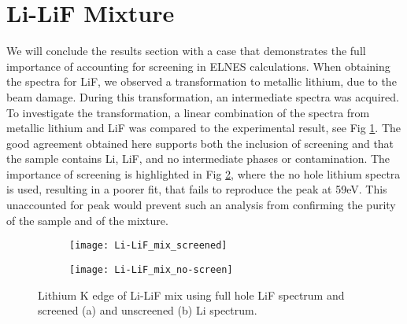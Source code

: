 \section{Li-LiF Mixture}
We will conclude the results section with a case that demonstrates the full importance of accounting for screening in ELNES calculations.  When obtaining the spectra for LiF, we observed a transformation to metallic lithium, due to the beam damage.   During this transformation, an intermediate spectra was acquired.  To investigate the transformation, a linear combination of the spectra from metallic lithium and LiF was compared to the experimental result, see Fig \ref{mix-screened}.  The good agreement obtained here supports both the inclusion of screening and that the sample contains  Li, LiF, and no intermediate phases or contamination.  The importance of screening is highlighted in Fig \ref{mix-unscreened}, where the no hole lithium spectra is used, resulting in a poorer fit, that fails to reproduce the peak at 59eV.  This unaccounted for peak would prevent such an  analysis from confirming the purity of the sample and of the mixture.  



\begin{figure}
	\centering
	\begin{subfigure}{0.45\textwidth}
		\texttt{[image: Li-LiF\_mix\_screened]}
		\caption{}
		\label{mix-screened}
	\end{subfigure}
\hfill
	\begin{subfigure}{0.45\textwidth}
		\texttt{[image: Li-LiF\_mix\_no-screen]}
		\caption{}
		\label{mix-unscreened}
	\end{subfigure}
	\caption{Lithium K edge of Li-LiF mix using full hole LiF spectrum and screened (a) and unscreened (b) Li spectrum. }

\label{Li-LiF_mix_screened}
\end{figure}



